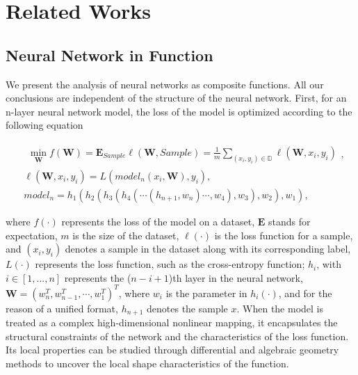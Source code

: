 \section{Related Works}
\subsection{Neural Network in Function}
We present the analysis of neural networks as composite functions. All our conclusions are independent of the structure of the neural network.
First, for an n-layer neural network model, the loss of the model is optimized according to the following equation
\begin{small} 
\begin{equation}
\begin{aligned} & \begin{aligned}
\min_{\textbf{W}}f(\textbf{W})=\mathbf{E}_{Sample}\ell(\textbf{W},Sample)=\frac{1}{m}\sum_{(x_{i},y_{i})\in\mathbb{D}}\ell(\textbf{W},x_{i},y_{i})\end{aligned},\\
&\ell(\textbf{W},x_{i},y_{i})=L(model_{n}(x_{i},\textbf{W}),y_{i}),\\  & model_{n}=h_1(h_2(h_3(h_4(\cdots(h_{n+1},w_{n})\cdots,w_4),w_3),w_2),w_1),\end{aligned}
\label{eq1}
\end{equation}\end{small}

\noindent where $f(\cdot)$ represents the loss of the model on a dataset, $\mathbf{E}$ stands for expectation, $m$ is the size of the dataset, $\ell(\cdot)$ is the loss function for a sample, and $(x_i,y_i)$ denotes a sample in the dataset along with its corresponding label, $L(\cdot)$ represents the loss function, such as the cross-entropy function; $h_i$, with $i\in[1,...,n]$ represents the ($n-i+1$)th layer in the neural network, $\textbf{W} = (w_n^T,w_{n-1}^T,\cdots,w_1^T)^T$, where $w_i$ is the parameter in $h_i(\cdot)$, and for the reason of a unified format, $h_{n+1}$ denotes the sample $x$.
When the model is treated as a complex high-dimensional nonlinear mapping, it encapsulates the structural constraints of the network and the characteristics of the loss function. Its local properties can be studied through differential and algebraic geometry methods to uncover the local shape characteristics of the function.
